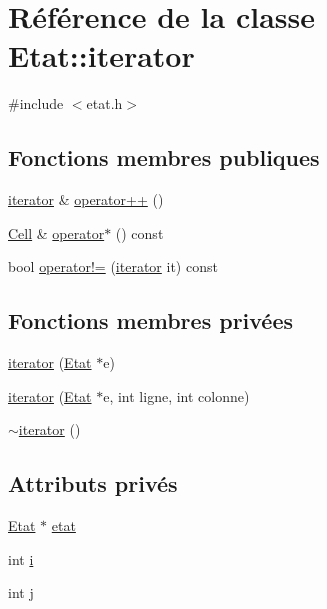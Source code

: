 \hypertarget{class_etat_1_1iterator}{}\section{Référence de la classe Etat\+:\+:iterator}
\label{class_etat_1_1iterator}


{\ttfamily \#include $<$etat.\+h$>$}

\subsection*{Fonctions membres publiques}
\begin{DoxyCompactItemize}
\item 
\mbox{\hyperlink{class_etat_1_1iterator}{iterator}} \& \mbox{\hyperlink{class_etat_1_1iterator_a7e2fe0cbe54ffc96b76aef84721d10fc}{operator++}} ()
\item 
\mbox{\hyperlink{class_cell}{Cell}} \& \mbox{\hyperlink{class_etat_1_1iterator_ab9a283bfd82bf15cac4f21422ceee680}{operator$\ast$}} () const
\item 
bool \mbox{\hyperlink{class_etat_1_1iterator_a5fd28a48c9b5ae5ccb7c3223dfcbd2da}{operator!=}} (\mbox{\hyperlink{class_etat_1_1iterator}{iterator}} it) const
\end{DoxyCompactItemize}
\subsection*{Fonctions membres privées}
\begin{DoxyCompactItemize}
\item 
\mbox{\hyperlink{class_etat_1_1iterator_a01a855525508b81c9fb934919bed65fa}{iterator}} (\mbox{\hyperlink{class_etat}{Etat}} $\ast$e)
\item 
\mbox{\hyperlink{class_etat_1_1iterator_a06e37005733f77329198c45ee1c70d3e}{iterator}} (\mbox{\hyperlink{class_etat}{Etat}} $\ast$e, int ligne, int colonne)
\item 
\mbox{\hyperlink{class_etat_1_1iterator_a6748d8aed797bb910dd9816410c2adb3}{$\sim$iterator}} ()
\end{DoxyCompactItemize}
\subsection*{Attributs privés}
\begin{DoxyCompactItemize}
\item 
\mbox{\hyperlink{class_etat}{Etat}} $\ast$ \mbox{\hyperlink{class_etat_1_1iterator_af223b227a9588b31861be17ac6aac003}{etat}}
\item 
int \mbox{\hyperlink{class_etat_1_1iterator_a6be03f617a5c2e26b1e0c5f92b7da2d9}{i}}
\item 
int \mbox{\hyperlink{class_etat_1_1iterator_a1f7dadb92cecfe5dbf0f2427a9df7977}{j}}
\end{DoxyCompactItemize}
